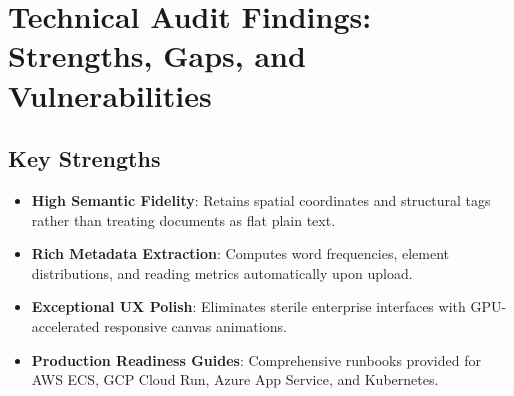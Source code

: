 \documentclass[11pt,a4paper]{article}
\begin{document}
\section{Technical Audit Findings: Strengths, Gaps, and Vulnerabilities}

\subsection{Key Strengths}
\begin{itemize}[leftmargin=*]
    \item[\textcolor{successgreen}{\checkmark}] \textbf{High Semantic Fidelity}: Retains spatial coordinates and structural tags rather than treating documents as flat plain text.
    \item[\textcolor{successgreen}{\checkmark}] \textbf{Rich Metadata Extraction}: Computes word frequencies, element distributions, and reading metrics automatically upon upload.
    \item[\textcolor{successgreen}{\checkmark}] \textbf{Exceptional UX Polish}: Eliminates sterile enterprise interfaces with GPU-accelerated responsive canvas animations.
    \item[\textcolor{successgreen}{\checkmark}] \textbf{Production Readiness Guides}: Comprehensive runbooks provided for AWS ECS, GCP Cloud Run, Azure App Service, and Kubernetes.
\end{itemize}
\end{document}
